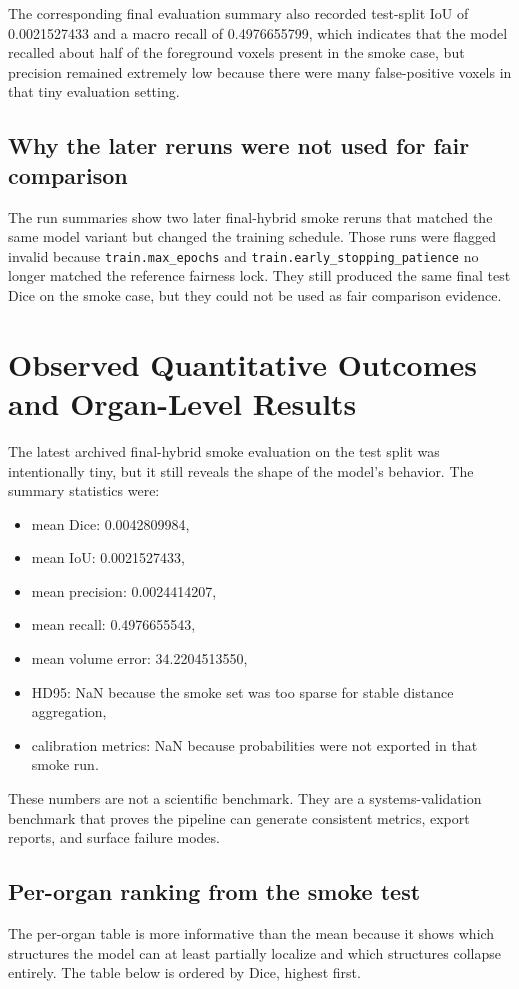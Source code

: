 \documentclass[11pt,a4paper]{article}
\begin{document}
The corresponding final evaluation summary also recorded test-split IoU of 0.0021527433 and a macro recall of 0.4976655799, which indicates that the model recalled about half of the foreground voxels present in the smoke case, but precision remained extremely low because there were many false-positive voxels in that tiny evaluation setting.

\subsection{Why the later reruns were not used for fair comparison}
The run summaries show two later final-hybrid smoke reruns that matched the same model variant but changed the training schedule. Those runs were flagged invalid because \texttt{train.max\_epochs} and \texttt{train.early\_stopping\_patience} no longer matched the reference fairness lock. They still produced the same final test Dice on the smoke case, but they could not be used as fair comparison evidence.

\section{Observed Quantitative Outcomes and Organ-Level Results}
The latest archived final-hybrid smoke evaluation on the test split was intentionally tiny, but it still reveals the shape of the model's behavior. The summary statistics were:
\begin{itemize}[leftmargin=1.5em]
    \item mean Dice: 0.0042809984,
    \item mean IoU: 0.0021527433,
    \item mean precision: 0.0024414207,
    \item mean recall: 0.4976655543,
    \item mean volume error: 34.2204513550,
    \item HD95: NaN because the smoke set was too sparse for stable distance aggregation,
    \item calibration metrics: NaN because probabilities were not exported in that smoke run.
\end{itemize}

These numbers are not a scientific benchmark. They are a systems-validation benchmark that proves the pipeline can generate consistent metrics, export reports, and surface failure modes.

\subsection{Per-organ ranking from the smoke test}
The per-organ table is more informative than the mean because it shows which structures the model can at least partially localize and which structures collapse entirely. The table below is ordered by Dice, highest first.
\end{document}
